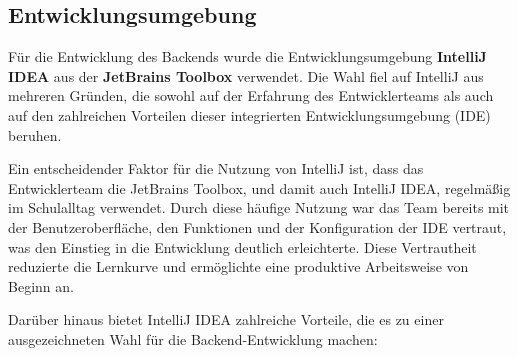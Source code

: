 
\subsection{Entwicklungsumgebung}
Für die Entwicklung des Backends wurde die Entwicklungsumgebung \textbf{IntelliJ IDEA} aus der \textbf{JetBrains Toolbox} verwendet. Die Wahl fiel auf IntelliJ aus mehreren Gründen, die sowohl auf der Erfahrung des Entwicklerteams als auch auf den zahlreichen Vorteilen dieser integrierten Entwicklungsumgebung (IDE) beruhen.  

Ein entscheidender Faktor für die Nutzung von IntelliJ ist, dass das Entwicklerteam die JetBrains Toolbox, und damit auch IntelliJ IDEA, regelmäßig im Schulalltag verwendet. Durch diese häufige Nutzung war das Team bereits mit der Benutzeroberfläche, den Funktionen und der Konfiguration der IDE vertraut, was den Einstieg in die Entwicklung deutlich erleichterte. Diese Vertrautheit reduzierte die Lernkurve und ermöglichte eine produktive Arbeitsweise von Beginn an.  

Darüber hinaus bietet IntelliJ IDEA zahlreiche Vorteile, die es zu einer ausgezeichneten Wahl für die Backend-Entwicklung machen: 

